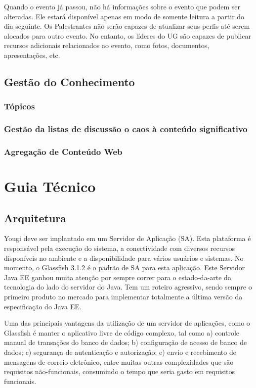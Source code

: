 \documentclass[envcountsame,envcountchap]{svmono}
\begin{document}
Quando o evento já passou, não há informações sobre o evento que podem ser alteradas. Ele estará disponível apenas em modo de somente leitura a partir do dia seguinte. Os Palestrantes não serão capazes de atualizar seus perfis até serem alocados para outro evento. No entanto, os líderes do UG são capazes de publicar recursos adicionais relacionados ao evento, como fotos, documentos, apresentações, etc.

\chapter{Gestão do Conhecimento}

\section{Tópicos}

\section{Gestão da listas de discussão o caos à conteúdo significativo}

\section{Agregação de Conteúdo Web}

\part{Guia Técnico}

\chapter{Arquitetura}

Yougi deve ser implantado em um Servidor de Aplicação (SA). Esta plataforma é responsável pela execução do sistema, a conectividade com diversos recursos disponíveis no ambiente e a disponibilidade para vários usuários e sistemas. No momento, o Glassfish 3.1.2 é o padrão de SA para esta aplicação. Este Servidor Java EE ganhou muita atenção por sempre correr para o estado-da-arte da tecnologia do lado do servidor do Java. Tem um roteiro agressivo, sendo sempre o primeiro produto no mercado para implementar totalmente a última versão da especificação do Java EE.

Uma das principais vantagens da utilização de um servidor de aplicações, como o Glassfish é manter o aplicativo livre de código complexo, tal como a) controle manual de transações do banco de dados; b) configuração de acesso de banco de dados; c) segurança de autenticação e autorização; e) envio e recebimento de mensagens de correio eletrônico, entre muitas outras complexidades que são requisitos não-funcionais, consumindo o tempo que seria gasto em requisitos funcionais.
\end{document}
